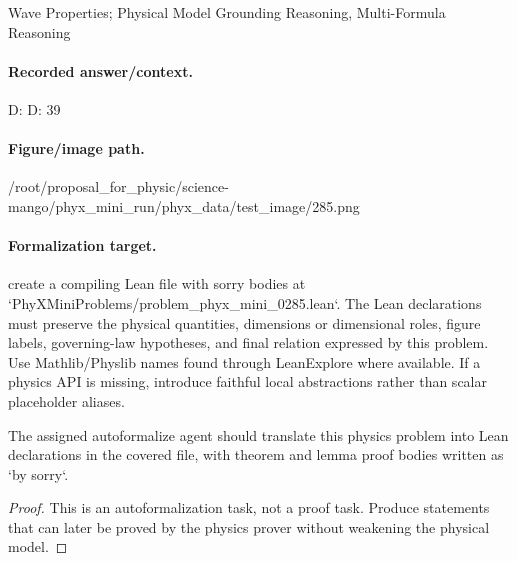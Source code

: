 Wave Properties; Physical Model Grounding Reasoning, Multi-Formula Reasoning

\paragraph{Recorded answer/context.}
D: D: 39

\paragraph{Figure/image path.}
/root/proposal\_for\_physic/science-mango/phyx\_mini\_run/phyx\_data/test\_image/285.png

\paragraph{Formalization target.}
create a compiling Lean file with sorry bodies at `PhyXMiniProblems/problem\_phyx\_mini\_0285.lean`. The Lean declarations must preserve the physical quantities, dimensions or dimensional roles, figure labels, governing-law hypotheses, and final relation expressed by this problem.
Use Mathlib/Physlib names found through LeanExplore where available. If a physics API is missing, introduce faithful local abstractions rather than scalar placeholder aliases.

\begin{theorem}
\label{thm:physics:phyx_mini_0285:target}
The assigned autoformalize agent should translate this physics problem into Lean declarations in the covered file, with theorem and lemma proof bodies written as `by sorry`.
\end{theorem}
\begin{proof}
This is an autoformalization task, not a proof task. Produce statements that can later be proved by the physics prover without weakening the physical model.
\end{proof}

